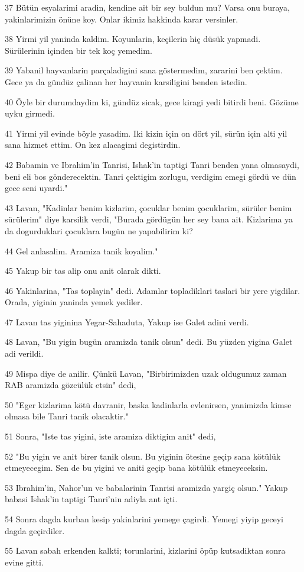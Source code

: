 \par 37 Bütün esyalarimi aradin, kendine ait bir sey buldun mu? Varsa onu buraya, yakinlarimizin önüne koy. Onlar ikimiz hakkinda karar versinler.
\par 38 Yirmi yil yaninda kaldim. Koyunlarin, keçilerin hiç düsük yapmadi. Sürülerinin içinden bir tek koç yemedim.
\par 39 Yabanil hayvanlarin parçaladigini sana göstermedim, zararini ben çektim. Gece ya da gündüz çalinan her hayvanin karsiligini benden istedin.
\par 40 Öyle bir durumdaydim ki, gündüz sicak, gece kiragi yedi bitirdi beni. Gözüme uyku girmedi.
\par 41 Yirmi yil evinde böyle yasadim. Iki kizin için on dört yil, sürün için alti yil sana hizmet ettim. On kez alacagimi degistirdin.
\par 42 Babamin ve Ibrahim'in Tanrisi, Ishak'in taptigi Tanri benden yana olmasaydi, beni eli bos gönderecektin. Tanri çektigim zorlugu, verdigim emegi gördü ve dün gece seni uyardi."
\par 43 Lavan, "Kadinlar benim kizlarim, çocuklar benim çocuklarim, sürüler benim sürülerim" diye karsilik verdi, "Burada gördügün her sey bana ait. Kizlarima ya da dogurduklari çocuklara bugün ne yapabilirim ki?
\par 44 Gel anlasalim. Aramiza tanik koyalim."
\par 45 Yakup bir tas alip onu anit olarak dikti.
\par 46 Yakinlarina, "Tas toplayin" dedi. Adamlar topladiklari taslari bir yere yigdilar. Orada, yiginin yaninda yemek yediler.
\par 47 Lavan tas yiginina Yegar-Sahaduta, Yakup ise Galet adini verdi.
\par 48 Lavan, "Bu yigin bugün aramizda tanik olsun" dedi. Bu yüzden yigina Galet adi verildi.
\par 49 Mispa diye de anilir. Çünkü Lavan, "Birbirimizden uzak oldugumuz zaman RAB aramizda gözcülük etsin" dedi,
\par 50 "Eger kizlarima kötü davranir, baska kadinlarla evlenirsen, yanimizda kimse olmasa bile Tanri tanik olacaktir."
\par 51 Sonra, "Iste tas yigini, iste aramiza diktigim anit" dedi,
\par 52 "Bu yigin ve anit birer tanik olsun. Bu yiginin ötesine geçip sana kötülük etmeyecegim. Sen de bu yigini ve aniti geçip bana kötülük etmeyeceksin.
\par 53 Ibrahim'in, Nahor'un ve babalarinin Tanrisi aramizda yargiç olsun." Yakup babasi Ishak'in taptigi Tanri'nin adiyla ant içti.
\par 54 Sonra dagda kurban kesip yakinlarini yemege çagirdi. Yemegi yiyip geceyi dagda geçirdiler.
\par 55 Lavan sabah erkenden kalkti; torunlarini, kizlarini öpüp kutsadiktan sonra evine gitti.


